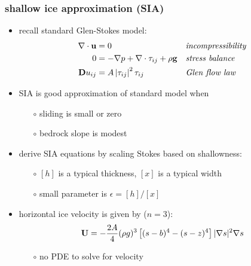 \documentclass[hide notes,intlimits]{beamer}
\newcommand{\eps}{\epsilon}
\begin{document}
\begin{frame}
  \frametitle{shallow ice approximation (SIA)}

\begin{itemize}
\item recall standard Glen-Stokes model:
\small
\begin{align*}
\nabla \cdot \mathbf{u} &= 0 &&\text{\emph{incompressibility}} \\
0 &= - \nabla p + \nabla \cdot \tau_{ij} + \rho \mathbf{g} &&\text{\emph{stress balance}} \\
\mathbf{D}u_{ij} &= A \left|\tau_{ij}\right|^2 \tau_{ij} &&\text{\emph{Glen flow law}}
\end{align*}
\normalsize
\item SIA is good approximation of standard model when
  \begin{itemize}
  \item[$\circ$] sliding is small or zero
  \item[$\circ$] bedrock slope is modest
  \end{itemize}
\item derive SIA equations by scaling Stokes based on shallowness:
  \begin{itemize}
  \item[$\circ$] $[h]$ is a typical thickness, $[x]$ is a typical width
  \item[$\circ$] small parameter is $\eps = [h] / [x]$
  \end{itemize}
\item horizontal ice velocity is given by ($n=3$): 
  $${\bf U}  =  - \frac{2 A}{4} (\rho g)^{3} \left[ (s-b)^4 - (s - z)^4  \right] 
|\nabla s |^{2} \nabla s$$

\vspace{-2mm}
  \begin{itemize}
  \item[$\circ$] no PDE to solve for velocity
  \end{itemize}
\end{itemize}
\end{frame}
\end{document}
